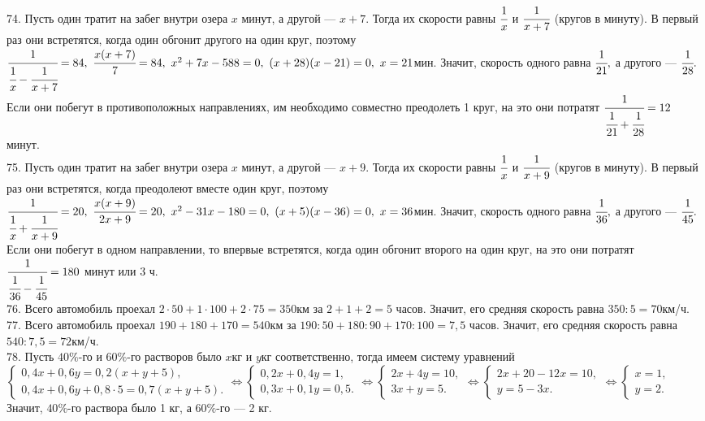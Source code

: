 74. Пусть один тратит на забег внутри озера $x$ минут, а другой --- $x+7.$ Тогда их скорости равны $\cfrac{1}{x}$ и $\cfrac{1}{x+7}$ (кругов в минуту). В первый раз они встретятся, когда один обгонит другого на один круг, поэтому $\cfrac{1}{\cfrac{1}{x}-\cfrac{1}{x+7}}=84,\ \cfrac{x(x+7)}{7}=84,\
x^2+7x-588=0,\ (x+28)(x-21)=0,\ x=21$мин. Значит, скорость одного равна $\cfrac{1}{21},$ а другого --- $\cfrac{1}{28}.$ Если они побегут в противоположных направлениях, им  необходимо совместно преодолеть 1 круг, на это они потратят $\cfrac{1}{\cfrac{1}{21}+\cfrac{1}{28}}=12$ минут.\\
75. Пусть один тратит на забег внутри озера $x$ минут, а другой --- $x+9.$ Тогда их скорости равны $\cfrac{1}{x}$ и $\cfrac{1}{x+9}$ (кругов в минуту). В первый раз они встретятся, когда преодолеют вместе один круг, поэтому $\cfrac{1}{\cfrac{1}{x}+\cfrac{1}{x+9}}=20,\ \cfrac{x(x+9)}{2x+9}=20,\
x^2-31x-180=0,\ (x+5)(x-36)=0,\ x=36$мин. Значит, скорость одного равна $\cfrac{1}{36},$ а другого --- $\cfrac{1}{45}.$ Если они побегут в одном направлении, то впервые встретятся, когда один обгонит второго на один круг, на это они потратят $\cfrac{1}{\cfrac{1}{36}-\cfrac{1}{45}}=180$ минут или 3 ч.\\
76. Всего автомобиль проехал $2\cdot50+1\cdot100+2\cdot75=350$км за $2+1+2=5$ часов. Значит, его средняя скорость равна $350:5=70$км/ч.\\
77. Всего автомобиль проехал $190+180+170=540$км за $190:50+180:90+170:100=7,5$ часов. Значит, его средняя скорость равна $540:7,5=72$км/ч.\\
78. Пусть $40\%$-го и $60\%$-го растворов было $x$кг и $y$кг соответственно, тогда имеем систему уравнений $\begin{cases}
0,4x+0,6y=0,2(x+y+5),\\ 0,4x+0,6y+0,8\cdot5=0,7(x+y+5).\end{cases}\Leftrightarrow\begin{cases}
0,2x+0,4y=1,\\ 0,3x+0,1y=0,5.\end{cases}\Leftrightarrow\begin{cases}
2x+4y=10,\\ 3x+y=5.\end{cases}\Leftrightarrow\begin{cases}
2x+20-12x=10,\\ y=5-3x.\end{cases}\Leftrightarrow\begin{cases}
x=1,\\ y=2.\end{cases}$ Значит, $40\%$-го раствора было 1 кг, а $60\%$-го --- 2 кг.\\
